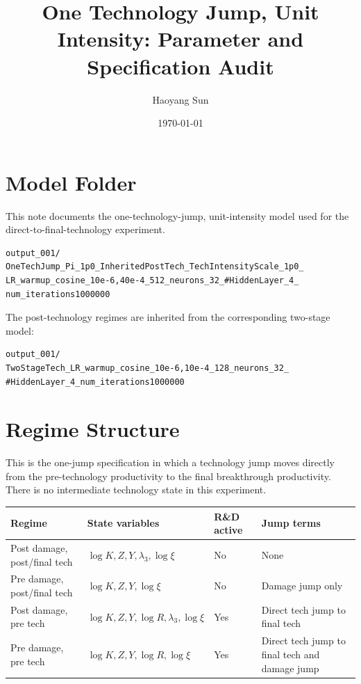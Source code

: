 \documentclass[11pt]{article}
\title{One Technology Jump, Unit Intensity: Parameter and Specification Audit}
\author{Haoyang Sun}
\date{\today}
\begin{document}
\maketitle

\section{Model Folder}

This note documents the one-technology-jump, unit-intensity model used for the direct-to-final-technology experiment.

\begin{verbatim}
output_001/
OneTechJump_Pi_1p0_InheritedPostTech_TechIntensityScale_1p0_
LR_warmup_cosine_10e-6,40e-4_512_neurons_32_#HiddenLayer_4_
num_iterations1000000
\end{verbatim}

The post-technology regimes are inherited from the corresponding two-stage model:
\begin{verbatim}
output_001/
TwoStageTech_LR_warmup_cosine_10e-6,10e-4_128_neurons_32_
#HiddenLayer_4_num_iterations1000000
\end{verbatim}

\section{Regime Structure}

This is the one-jump specification in which a technology jump moves directly from the pre-technology productivity to the final breakthrough productivity.  There is no intermediate technology state in this experiment.

\begin{center}
\begin{tabular}{>{\raggedright\arraybackslash}p{}
                >{\raggedright\arraybackslash}p{}
                >{\raggedright\arraybackslash}p{}
                >{\raggedright\arraybackslash}p{}}
\toprule
Regime & State variables & R\&D active & Jump terms \\
\midrule
Post damage, post/final tech
& $\log K,Z,Y,\lambda_3,\log \xi$
& No
& None \\
Pre damage, post/final tech
& $\log K,Z,Y,\log \xi$
& No
& Damage jump only \\
Post damage, pre tech
& $\log K,Z,Y,\log R,\lambda_3,\log \xi$
& Yes
& Direct tech jump to final tech \\
Pre damage, pre tech
& $\log K,Z,Y,\log R,\log \xi$
& Yes
& Direct tech jump to final tech and damage jump \\
\bottomrule
\end{tabular}
\end{center}
\end{document}
